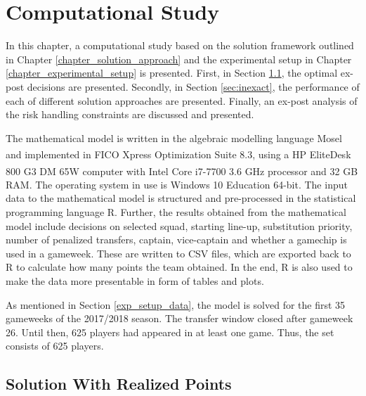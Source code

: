 
\chapter{Computational Study} \label{chapter_computational_study}


In this chapter, a computational study based on the solution framework outlined in Chapter \ref{chapter_solution_approach} and the experimental setup in Chapter \ref{chapter_experimental_setup} is presented. First, in Section \ref{sec:exact}, the optimal ex-post decisions are presented. Secondly, in Section \ref{sec:inexact}, the performance of each of different solution approaches are presented. Finally, an ex-post analysis of the risk handling constraints are discussed and presented. 

\newpar

The mathematical model is written in the algebraic modelling language Mosel and implemented in FICO\textsuperscript {\textregistered} Xpress Optimization Suite 8.3, using a HP EliteDesk 800 G3 DM 65W computer with Intel\textsuperscript{\textregistered} Core\textsuperscript{\texttrademark} i7-7700 3.6 GHz processor and 32 GB RAM. The operating system in use is Windows 10 Education 64-bit. The input data to the mathematical model is structured and pre-processed in the statistical programming language R. Further, the results obtained from the mathematical model include decisions on selected squad, starting line-up, substitution priority, number of penalized transfers, captain, vice-captain and whether a gamechip is used in a gameweek. These are written to CSV files, which are exported back to R to calculate how many points the team obtained. In the end, R is also used to make the data more presentable in form of tables and plots. 

\newpar

As mentioned in Section \ref{exp_setup_data}, the model is solved for the first 35 gameweeks of the 2017/2018 season. The transfer window closed after gameweek 26. Until then, 625 players had appeared in at least one game. Thus, the set consists of 625 players.

\section{Solution With Realized Points}\label{sec:exact}


